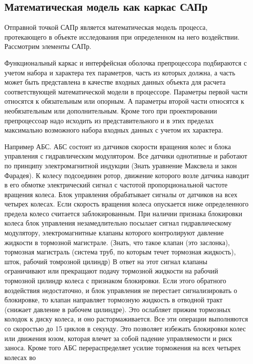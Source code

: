 \subsection{Математическая модель как каркас САПр}
Отправной точкой САПр является математическая модель процесса, протекающего в
объекте исследования при определенном на него воздействии. Рассмотрим элементы 
САПр.\par
Функциональный каркас и интерфейсная оболочка препроцессора подбираются с 
учетом набора и характера тех параметров, часть из которых должна, а часть 
может быть представлена в качестве входных данных объекта для расчета
соответствующей математической модели в процессоре. Параметры первой части
относятся к обязательным или опорным. А параметры второй части относятся к
необязательным или дополнительным. Кроме того при проектировании препроцессоар
надо исходить из представительного и в этих пределах максимально возможного
набора входных данных с учетом их характера.\par
Например АБС. АБС состоит из датчиков скорости вращения колес и блока управления
с гидравлическим модулятором. Все датчики однотипные и работают по принципу
электромагнитной индукции {\ttfamily (Знать уравнение Максвела и закон
Фарадея)}. К колесу подсоединен ротор, движение которого возле датчика наводит в
его обмотке электрический сигнал с частотой пропорциональной частоте вращения
колеса. Блок управления обрабатывает сигналы от датчиков на всех четырех
колесах. Если скорость вращения колеса опускается ниже определенного предела
колесо считается заблокированным. При наличии признака блокировки колеса блок
управления незамедлительно посылает сигнал гидравлическому модулятору,
электромагнитные клапаны которого контролируют давление жидкости в тормозной
магистрале. {\ttfamily (Знать, что такое клапан (это заслонка), тормозная
магистраль (система труб, по которым течет тормозная жидкость), шток, рабочий томрозной
цилиндр)} В ответ на этот сигнал клапаны ограничивают или прекращают подачу 
тормозной жидкости на рабочий тормозной цилиндр колеса с признаком блокировки.
Если этого обратного воздействия недостаточно, и блок управления не перестает
сигнализировать о блокировке, то клапан направляет тормозную жидкость в отводной
тракт (снижает давление в рабочем цилиндре). Это ослабляет прижим тормозных
колодок к диску колеса, и оно растормаживается. Все эти операции выполняются со
скоростью до 15 циклов в секунду. Это позволяет избежать блокировки колес или
движения юзом, которая влечет за собой падение управляемости и риск заноса.
Кроме того АБС перераспределяет усилие торможения на всех четырех колесах во
